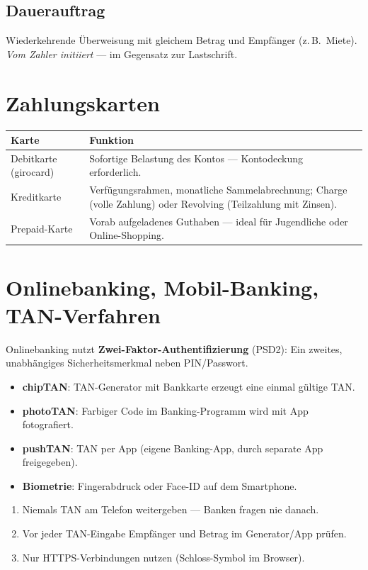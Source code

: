 \documentclass[11pt, a4paper]{article}
\begin{document}
\subsection{Dauerauftrag}

Wiederkehrende Überweisung mit gleichem Betrag und Empfänger (z.\,B.\ Miete). \emph{Vom
Zahler initiiert} --- im Gegensatz zur Lastschrift.

\section{Zahlungskarten}

\begin{center}
\begin{tabular}{p{3.5cm} p{10.5cm}}
\toprule
\textbf{Karte} & \textbf{Funktion}\\
\midrule
Debitkarte (girocard) & Sofortige Belastung des Kontos --- Kontodeckung erforderlich.\\
Kreditkarte & Verfügungsrahmen, monatliche Sammelabrechnung; Charge (volle Zahlung) oder Revolving (Teilzahlung mit Zinsen).\\
Prepaid-Karte & Vorab aufgeladenes Guthaben --- ideal für Jugendliche oder Online-Shopping.\\
\bottomrule
\end{tabular}
\end{center}

\section{Onlinebanking, Mobil-Banking, TAN-Verfahren}

Onlinebanking nutzt \textbf{Zwei-Faktor-Authentifizierung} (PSD2): Ein zweites,
unabhängiges Sicherheitsmerkmal neben PIN/Passwort.

\begin{itemize}[itemsep=2pt]
  \item \textbf{chipTAN}: TAN-Generator mit Bankkarte erzeugt eine einmal gültige TAN.
  \item \textbf{photoTAN}: Farbiger Code im Banking-Programm wird mit App fotografiert.
  \item \textbf{pushTAN}: TAN per App (eigene Banking-App, durch separate App freigegeben).
  \item \textbf{Biometrie}: Fingerabdruck oder Face-ID auf dem Smartphone.
\end{itemize}

\begin{merksatz}[title={Sicherheitsregeln}]
\begin{enumerate}[itemsep=0pt]
  \item Niemals TAN am Telefon weitergeben --- Banken fragen nie danach.
  \item Vor jeder TAN-Eingabe Empfänger und Betrag im Generator/App prüfen.
  \item Nur HTTPS-Verbindungen nutzen (Schloss-Symbol im Browser).
\end{enumerate}
\end{merksatz}
\end{document}
